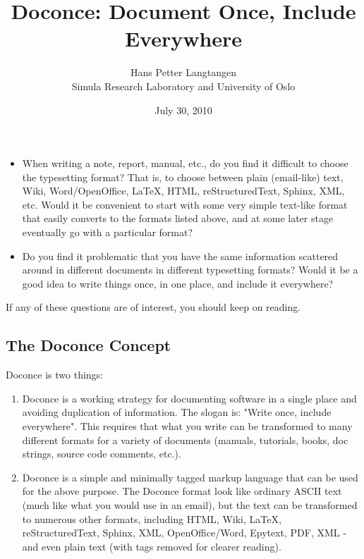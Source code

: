 \documentclass{article}
\begin{document}
\title{Doconce: Document Once, Include Everywhere}

\author{Hans Petter Langtangen \\ Simula Research Laboratory and University of Oslo}

\date{July 30, 2010} 
\maketitle



\begin{itemize}
 \item When writing a note, report, manual, etc., do you find it difficult
   to choose the typesetting format? That is, to choose between plain
   (email-like) text, Wiki, Word/OpenOffice, LaTeX, HTML,
   reStructuredText, Sphinx, XML, etc.  Would it be convenient to
   start with some very simple text-like format that easily converts
   to the formats listed above, and at some later stage eventually go
   with a particular format?

 \item Do you find it problematic that you have the same information
   scattered around in different documents in different typesetting
   formats? Would it be a good idea to write things once, in one
   place, and include it everywhere?

\end{itemize}
If any of these questions are of interest, you should keep on reading.

\subsection*{The Doconce Concept}

Doconce is two things:

\begin{enumerate}
 \item Doconce is a working strategy for documenting software in a single
    place and avoiding duplication of information. The slogan is:
    "Write once, include everywhere". This requires that what you
    write can be transformed to many different formats for a variety
    of documents (manuals, tutorials, books, doc strings, source code
    comments, etc.).

 \item Doconce is a simple and minimally tagged markup language that can
    be used for the above purpose. The Doconce format look
    like ordinary ASCII text (much like what you would use in an
    email), but the text can be transformed to numerous other formats,
    including HTML, Wiki, LaTeX, reStructuredText, Sphinx, XML,
    OpenOffice/Word, Epytext, PDF, XML - and even plain text (with
    tags removed for clearer reading).


\end{enumerate}
\end{document}
